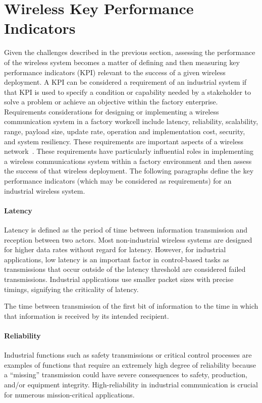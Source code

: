 \section{Wireless Key Performance Indicators}

Given the challenges described in the previous section, assessing the performance of the wireless system becomes a matter of defining and then measuring key performance indicators (KPI) relevant to the success of a given wireless deployment.  A KPI can be considered a requirement of an industrial system if that KPI is used to specify a condition or capability needed by a stakeholder to solve a problem or achieve an objective within the factory enterprise.  Requirements considerations for designing or implementing a wireless communication system in a factory workcell include latency, reliability, scalability, range, payload size, update rate, operation and implementation cost, security, and system resiliency. These requirements are important aspects of a wireless network~\cite{CandellRW2017}. These requirements have particularly influential roles in implementing a wireless communications system within a factory environment and then assess the success of that wireless deployment.  The following paragraphs define the key performance indicators (which may be considered as requirements) for an industrial wireless system. 

\paragraph{Latency}
Latency is defined as the period of time between information transmission and reception between two actors.  Most non-industrial wireless systems are designed for higher data rates without regard for latency. However, for industrial applications, low latency is an important factor in control-based tasks as transmissions that occur outside of the latency threshold are considered failed transmissions. Industrial applications use smaller packet sizes with precise timings, signifying the criticality of latency.
\begin{definition}[Latency] \label{def:latency}
	The time between transmission of the first bit of information to the time in which that information is received by its intended recipient.
\end{definition}

\paragraph{Reliability}
Industrial functions such as safety transmissions or critical control processes are examples of functions that require an extremely high degree of reliability because a “missing” transmission could have severe consequences to safety, production, and/or equipment integrity. High-reliability in industrial communication is crucial for numerous mission-critical applications. 


